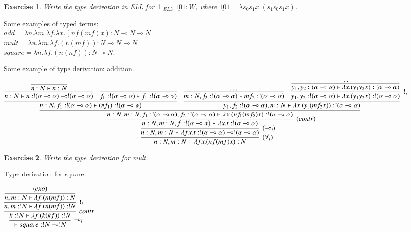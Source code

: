 \documentclass[a4paper,10pt]{article}
\newcommand{\limpl}{\multimap}  %
\newtheorem{exo}{Exercise}
\begin{document}
\begin{exo}
Write the type derivation in ELL for $\vdash_{ELL} \underbar{101} : W$, where $\underbar{101} = \lambda s_0 s_1 x. (s_1 s_0 s_1 x)$.
\end{exo}

 Some examples of typed terms:\\
$add = \lambda n. \lambda m. \lambda f. \lambda x. (n f (m f) x) : N \limpl N \limpl N$\\
$mult = \lambda n. \lambda m. \lambda f. (n (m f)) : N \limpl N \limpl N$\\
$square = \lambda n. \lambda f. (n (n f)) : N \limpl N$.

 Some example of type derivation: addition.\\
\vspace{0.3cm}
\hspace{-1.5cm}
\begin{small}
$ \infer[(\forall_i)]{n:N, m:N \vdash \lambda f x.(n f (m f) x) : N}
	{
	\infer[(\limpl_i)]{n:N , m:N \vdash \lambda f x. t : !(\alpha \limpl \alpha) \limpl !(\alpha \limpl \alpha)}
	{
	\infer[(contr)]{n:N , m:N, f:!(\alpha \limpl \alpha) \vdash \lambda x.t : !(\alpha \limpl \alpha)}
		{
			\infer{n:N , m:N, f_1:!(\alpha \limpl \alpha), f_2:!(\alpha \limpl \alpha) \vdash \lambda x. (n f_1 (m f_2) x) : !(\alpha \limpl \alpha)}
			{
			\infer{n:N, f_1:!(\alpha \limpl \alpha) \vdash (n f_1):!(\alpha \limpl \alpha)}
				{
				\infer{n:N \vdash n:!(\alpha \limpl \alpha) \limpl !(\alpha \limpl \alpha)}{\infer{n:N \vdash n:N}{}}
				&
				\infer{f_1:!(\alpha \limpl \alpha) \vdash f_1:!(\alpha \limpl \alpha)}{}
				}
			&
			\infer{y_1,f_2:!(\alpha \limpl \alpha), m:N \vdash \lambda x.(y_1 (m f_2 x)): !(\alpha \limpl \alpha)}
				{
				\infer{m:N, f_2:!(\alpha\limpl\alpha) \vdash m f_2 : !(\alpha \limpl \alpha)}{ \dots }
				&
				\infer[!_i]{y_1, y_2:!(\alpha \limpl \alpha) \vdash \lambda x. (y_1 y_2 x):!(\alpha \limpl \alpha)}
					{
					\infer{y_1, y_2:(\alpha \limpl \alpha) \vdash \lambda x. (y_1 y_2 x):(\alpha \limpl \alpha)}{ \dots } 
					}
				}
			}
		}
	}
	}$
\end{small}

\begin{exo}
Write the type derivation for mult.
\end{exo}

 Type derivation for square:
\begin{center}
$	\infer[\limpl_i]{\vdash square: !N \limpl !N}{
		\infer[contr]{k:!N \vdash \lambda f.(k (k f)): !N}{
			\infer[!_i]{n,m:!N \vdash \lambda f.(n (m f)): !N}{
				\infer{n,m:N \vdash \lambda f.(n (m f)): N}{ (exo) }
			}
		}
	}$
\end{center}
\end{document}
